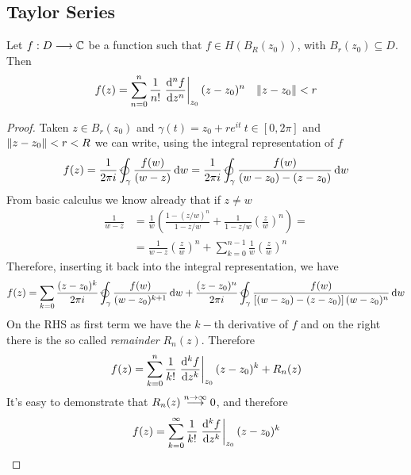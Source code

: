 \documentclass[../complete.tex]{subfiles}
\begin{document}
\subsection{Taylor Series}
\begin{thm}
	Let $f:D\fto\Cf$ be a function such that $f\in H(B_R(z_0))$, with $B_r(z_0)\subseteq D$. Then
	\begin{equation}
		f(z)=\sum_{n=0}^n\frac{1}{n!}\left.\derivative[n]{f}{z}\right|_{z_0}(z-z_0)^n\quad\norm{z-z_0}<r
		\label{eq:taylor}
	\end{equation}
\end{thm}
\begin{proof}
	Taken $z\in B_r(z_0)$ and $\gamma(t)=z_0+re^{it}\ t\in[0,2\pi]$ and $\norm{z-z_0}<r<R$ we can write, using the integral representation of $f$
	\begin{equation*}
		f(z)=\frac{1}{2\pi i}\ointccw_{\gamma}\frac{f(w)}{(w-z)}\diff w=\frac{1}{2\pi i}\ointccw_{\gamma}\frac{f(w)}{(w-z_0)-(z-z_0)}\diff w
	\end{equation*}
	From basic calculus we know already that if $z\ne w$
	\begin{equation*}
		\begin{aligned}
			\frac{1}{w-z}&=\frac{1}{w}\left( \frac{1-(z/w)^n}{1-z/w}+\frac{1}{1-z/w}\left( \frac{z}{w} \right)^n \right)=\\
			&=\frac{1}{w-z}\left( \frac{z}{w} \right)^n+\sum_{k=0}^{n-1}\frac{1}{w}\left( \frac{z}{w} \right)^n
		\end{aligned}
	\end{equation*}
	Therefore, inserting it back into the integral representation, we have
	\begin{equation*}
		f(z)=\sum_{k=0}\frac{(z-z_0)^k}{2\pi i}\ointccw_{\gamma}\frac{f(w)}{(w-z_0)^{k+1}}\diff w+\frac{(z-z_0)^n}{2\pi i}\ointccw_\gamma\frac{f(w)}{\left[ (w-z_0)-(z-z_0) \right](w-z_0)^n}\diff w
	\end{equation*}
	On the RHS as first term we have the $k-$th derivative of $f$ and on the right there is the so called \textit{remainder} $R_n(z)$. Therefore
	\begin{equation*}
		f(z)=\sum_{k=0}^{n}\frac{1}{k!}\left.\derivative[k]{f}{z}\right|_{z_0}(z-z_0)^k+R_n(z)
	\end{equation*}
	It's easy to demonstrate that $R_n(z)\fto[n\to\infty]0$, and therefore
	\begin{equation*}
		f(z)=\sum_{k=0}^\infty\frac{1}{k!}\left.\derivative[k]{f}{z}\right|_{z_0}(z-z_0)^k
	\end{equation*}
\end{proof}
\end{document}
